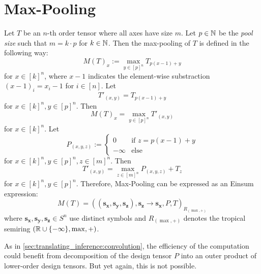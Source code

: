 \section{Max-Pooling}

Let $T$ be an $n$-th order tensor where all axes have size $m$.
Let $p \in \mathbb{N}$ be the \textit{pool size} such that $m = k \cdot p$ for $k \in \mathbb{N}$.
Then the max-pooling of $T$ is defined in the following way:
$$M(T)_{x} := \max\limits_{y \in [p]^n} T_{p (x - 1) + y}$$
for $x \in [k]^n$, where $x - 1$ indicates the element-wise substraction $(x - 1)_i = x_i - 1$ for $i \in [n]$.
Let
$$T'_{(x,y)} = T_{p (x - 1) + y}$$
for $x \in [k]^n, y \in [p]^n$.
Then
$$M(T)_{x} = \max\limits_{y \in [p]^n} T'_{(x,y)}$$
for $x \in [k]^n$. Let
$$P_{(x,y,z)} := \begin{cases}
    0 & \text{if } z = p (x - 1) + y\\
    -\infty & \text{else}
\end{cases}$$
for $x \in [k]^n, y \in [p]^n, z \in [m]^n$.
Then
$$T'_{(x,y)} = \max\limits_{z \in [m]^n} P_{(x,y,z)} + T_{z}$$
for $x \in [k]^n, y \in [p]^n$.
Therefore, Max-Pooling can be expressed as an Einsum expression:
$$M(T) = ((\bm{s_x},\bm{s_y},\bm{s_z}), \bm{s_z}  \rightarrow \bm{s_x}, P, T)_{R_{(\max, +)}}$$
where $\bm{s_x},\bm{s_y},\bm{s_z} \in S^n$ use distinct symbols and $R_{(\max, +)}$ denotes the tropical semiring $(\mathbb{R} \cup \lbrace -\infty \rbrace, \max, +)$.

As in \cref{sec:translating_inference:convolution}, the efficiency of the computation could benefit from decomposition of the design tensor $P$ into an outer product of lower-order design tensors.
But yet again, this is not possible.

